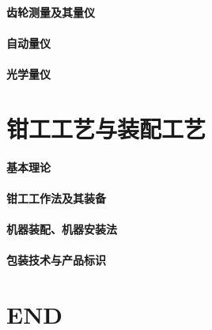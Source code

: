 \documentclass[UTF8]{../../ApplicationUniverse}
\begin{document}
\subsubsection{齿轮测量及其量仪}
\subsubsection{自动量仪}
\subsubsection{光学量仪}







\chapter{钳工工艺与装配工艺}
\subsubsection{基本理论}
\subsubsection{钳工工作法及其装备}
\subsubsection{机器装配、机器安装法}
\subsubsection{包装技术与产品标识}



\chapter{END}
\end{document}

